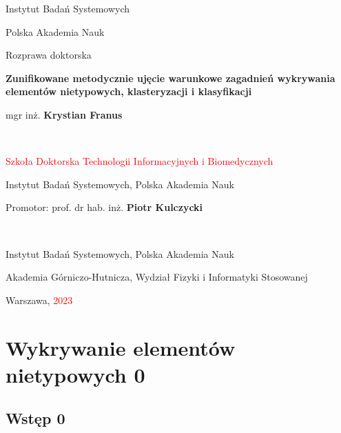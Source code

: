 \documentclass[12pt,a4paper,oneside]{book}
\theoremstyle{definition}
\begin{document}

\begin{titlepage}

\centering
Instytut Badań Systemowych

Polska Akademia Nauk

\vspace{2cm}
Rozprawa doktorska

\vspace{3cm}
{\Large \textbf{Zunifikowane metodycznie ujęcie warunkowe zagadnień wykrywania elementów nietypowych, klasteryzacji i klasyfikacji}}

\vspace{2cm}
{\large mgr inż. \textbf{Krystian Franus}}
\par~\par
\textcolor{red}{Szkoła Doktorska Technologii Informacyjnych i Biomedycznych}

Instytut Badań Systemowych, Polska Akademia Nauk

\vfill	
Promotor: prof. dr hab. inż. \textbf{Piotr Kulczycki}
\par~\par
Instytut Badań Systemowych, Polska Akademia Nauk

Akademia Górniczo-Hutnicza, Wydział Fizyki i Informatyki Stosowanej

\vfill
Warszawa, \textcolor{red}{2023}
\end{titlepage}


\tableofcontents
\setcounter{page}{2}  %







\chapter{Wykrywanie elementów nietypowych 0}

\section{Wstęp 0}
\end{document}
